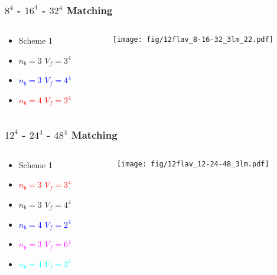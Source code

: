 \documentclass{beamer}
\begin{document}
  \begin{frame}
    \frametitle{$8^4$ - $16^4$ - $32^4$ Matching}
    \begin{columns}[T]
      \begin{column}{.3\textwidth}
        \begin{block}{}
          \begin{itemize}
            \item Scheme 1
            \item $n_b=3$ $V_f=3^4$
            \item \textcolor{blue}{$n_b=3$ $V_f=4^4$}
            \item \textcolor{red}{$n_b=4$ $V_f=2^4$}
          \end{itemize}
        \end{block}
      \end{column}
      \begin{column}{.7\textwidth}
        \begin{block}{}
          \texttt{[image: fig/12flav\_8-16-32\_3lm\_22.pdf]}
        \end{block}
      \end{column}
    \end{columns}
  \end{frame}

  \begin{frame}
    \frametitle{$12^4$ - $24^4$ - $48^4$ Matching}
    \begin{columns}[T]
      \begin{column}{.3\textwidth}
        \begin{block}{}
          \begin{itemize}
            \item Scheme 1
            \item \textcolor{red}{$n_b=3$ $V_f=3^4$}
            \item $n_b=3$ $V_f=4^4$
            \item \textcolor{blue}{$n_b=4$ $V_f=2^4$}
            \item \textcolor{magenta}{$n_b=3$ $V_f=6^4$}
            \item \textcolor{cyan}{$n_b=4$ $V_f=3^4$}
          \end{itemize}
        \end{block}
      \end{column}
      \begin{column}{.7\textwidth}
        \begin{block}{}
          \texttt{[image: fig/12flav\_12-24-48\_3lm.pdf]}
        \end{block}
      \end{column}
    \end{columns}
  \end{frame}
\end{document}
